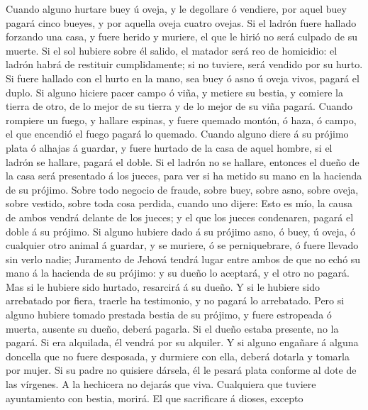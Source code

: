  Cuando alguno hurtare buey ú oveja, y le degollare ó
vendiere, por aquel buey pagará cinco bueyes, y por aquella oveja cuatro
ovejas.  Si el ladrón fuere hallado forzando una casa, y
fuere herido y muriere, el que le hirió no será culpado de su muerte.
 Si el sol hubiere sobre él salido, el matador será reo de
homicidio: el ladrón habrá de restituir cumplidamente; si no tuviere,
será vendido por su hurto.  Si fuere hallado con el hurto
en la mano, sea buey ó asno ú oveja vivos, pagará el duplo.
 Si alguno hiciere pacer campo ó viña, y metiere su
bestia, y comiere la tierra de otro, de lo mejor de su tierra y de lo
mejor de su viña pagará.  Cuando rompiere un fuego, y
hallare espinas, y fuere quemado montón, ó haza, ó campo, el que
encendió el fuego pagará lo quemado.  Cuando alguno diere
á su prójimo plata ó alhajas á guardar, y fuere hurtado de la casa de
aquel hombre, si el ladrón se hallare, pagará el doble. 
Si el ladrón no se hallare, entonces el dueño de la casa será presentado
á los jueces, para ver si ha metido su mano en la hacienda de su
prójimo.  Sobre todo negocio de fraude, sobre buey, sobre
asno, sobre oveja, sobre vestido, sobre toda cosa perdida, cuando uno
dijere: Esto es mío, la causa de ambos vendrá delante de los jueces; y
el que los jueces condenaren, pagará el doble á su prójimo.
 Si alguno hubiere dado á su prójimo asno, ó buey, ú
oveja, ó cualquier otro animal á guardar, y se muriere, ó se
perniquebrare, ó fuere llevado sin verlo nadie; 
Juramento de Jehová tendrá lugar entre ambos de que no echó su mano á la
hacienda de su prójimo: y su dueño lo aceptará, y el otro no pagará.
 Mas si le hubiere sido hurtado, resarcirá á su dueño.
 Y si le hubiere sido arrebatado por fiera, traerle ha
testimonio, y no pagará lo arrebatado.  Pero si alguno
hubiere tomado prestada bestia de su prójimo, y fuere estropeada ó
muerta, ausente su dueño, deberá pagarla.  Si el dueño
estaba presente, no la pagará. Si era alquilada, él vendrá por su
alquiler.  Y si alguno engañare á alguna doncella que no
fuere desposada, y durmiere con ella, deberá dotarla y tomarla por
mujer.  Si su padre no quisiere dársela, él le pesará
plata conforme al dote de las vírgenes.  A la hechicera
no dejarás que viva.  Cualquiera que tuviere ayuntamiento
con bestia, morirá.  El que sacrificare á dioses, excepto
